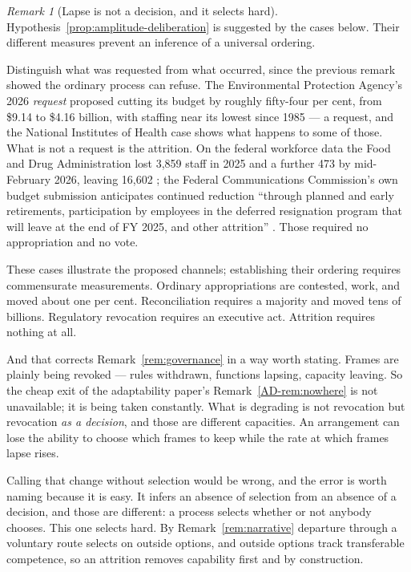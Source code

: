 \documentclass[11pt,a4paper]{article}
\theoremstyle{remark}
\newtheorem{remark}[definition]{Remark}
\begin{document}
\begin{remark}[Lapse is not a decision, and it selects hard]\label{rem:lapse}
Hypothesis~\ref{prop:amplitude-deliberation} is suggested by the cases below. Their different measures prevent an inference of a universal ordering.

Distinguish what was requested from what occurred, since the previous remark showed the ordinary
process can refuse. The Environmental Protection Agency's 2026 \emph{request} proposed cutting its
budget by roughly fifty-four per cent, from \$9.14 to \$4.16 billion, with staffing near its lowest since
1985 \citep{crsepa} --- a request, and the National Institutes of Health case shows what happens to some
of those. What is not a request is the attrition. On the federal workforce data the Food and Drug
Administration lost 3,859 staff in 2025 and a further 473 by mid-February 2026, leaving 16,602
\citep{fda2026}; the Federal Communications Commission's own budget submission anticipates continued
reduction ``through planned and early retirements, participation by employees in the deferred
resignation program that will leave at the end of FY 2025, and other attrition'' \citep{fcc2025}. Those
required no appropriation and no vote.

These cases illustrate the proposed channels; establishing their ordering requires commensurate measurements. Ordinary appropriations are
contested, work, and moved about one per cent. Reconciliation requires a majority and moved tens of
billions. Regulatory revocation requires an executive act. Attrition requires nothing at all.

And that corrects Remark~\ref{rem:governance} in a way worth stating. Frames are plainly being
revoked --- rules withdrawn, functions lapsing, capacity leaving. So the cheap exit of
the adaptability paper's Remark~\ref{AD-rem:nowhere} is not unavailable; it is being taken constantly. What is degrading is not
revocation but revocation \emph{as a decision}, and those are different capacities. An arrangement can
lose the ability to choose which frames to keep while the rate at which frames lapse rises.

Calling that change without selection would be wrong, and the error is worth naming because it is
easy. It infers an absence of selection from an absence of a decision, and those are different: a
process selects whether or not anybody chooses. This one selects hard. By Remark~\ref{rem:narrative}
departure through a voluntary route selects on outside options, and outside options track transferable
competence, so an attrition removes capability first and by construction.


\end{remark}
\end{document}
